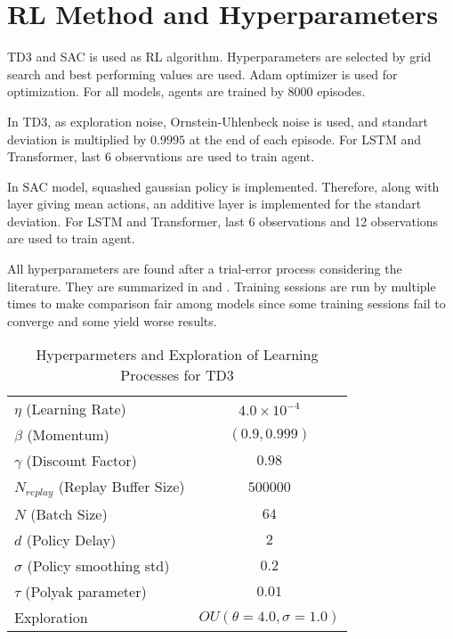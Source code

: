 \section{RL Method and Hyperparameters}
\label{sec:rlmethod}

TD3 and SAC is used as RL algorithm. 
Hyperparameters are selected by grid search and best performing values are used. Adam optimizer is used for optimization. 
For all models, agents are trained by 8000 episodes.

In TD3, as exploration noise, Ornstein-Uhlenbeck noise is used, and standart deviation is multiplied  by $0.9995$ at the end of each episode. For LSTM and Transformer, last 6 observations are used to train agent. 

In SAC model, squashed gaussian policy is implemented. 
Therefore, along with layer giving mean actions, an additive layer is implemented for the standart deviation. 
For LSTM and Transformer, last 6 observations and 12 observations are used to train agent. 

All hyperparameters are found after a trial-error process considering the literature. They  are summarized in  and . 
Training sessions are run by multiple times to make comparison fair among models since some training sessions fail to converge and some yield worse results.

\begin{table}
	\caption{Hyperparmeters and Exploration of Learning Processes for TD3}
	\begin{tabular}{|l||*{3}{c|}}\hline
		\backslashbox{Hyperparameter}{Model}
		&\makebox[5em]{RFFNN}&\makebox[5em]{LSTM}&\makebox[5em]{Transformer}\\\hline\hline
		$\eta$ (Learning Rate) & \multicolumn{3}{|c|}{$4.0\times10^{-4}$}\\\hline
		$\beta$ (Momentum) & \multicolumn{3}{|c|}{$(0.9, 0.999)$}\\\hline
		$\gamma$ (Discount Factor) & \multicolumn{3}{|c|}{$0.98$} \\\hline
		$N_{replay}$ (Replay Buffer Size) &\multicolumn{3}{|c|}{$500000$} \\\hline
		$N$ (Batch Size) &\multicolumn{3}{|c|}{$64$}\\\hline
		$d$ (Policy Delay) &\multicolumn{3}{|c|}{$2$}\\\hline
		$\sigma$ (Policy smoothing std) &\multicolumn{3}{|c|}{$0.2$}\\\hline
		$\tau$ (Polyak parameter) &\multicolumn{3}{|c|}{$0.01$}\\\hline
		Exploration &\multicolumn{3}{|c|}{$OU(\theta=4.0, \sigma=1.0)$}\\\hline
	\end{tabular}
	\label{table:hyperparams_td3}
\end{table}
\noindent

